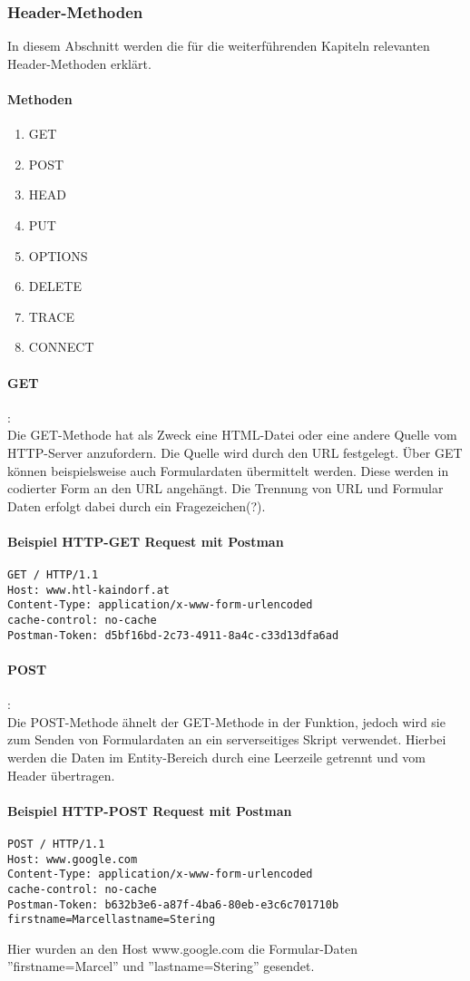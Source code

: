 \subsubsection{Header-Methoden}
In diesem Abschnitt werden die für die weiterführenden Kapiteln relevanten Header-Methoden erklärt.
\paragraph{Methoden}
\begin{enumerate}
\item GET
\item POST
\item HEAD
\item PUT
\item OPTIONS
\item DELETE
\item TRACE
\item CONNECT
\end{enumerate}
\paragraph{GET}:\\Die GET-Methode hat als Zweck eine HTML-Datei oder eine andere Quelle vom HTTP-Server anzufordern. Die Quelle wird durch den URL festgelegt. Über GET können beispielsweise auch Formulardaten übermittelt werden. Diese werden in codierter Form an den URL angehängt. Die Trennung von URL und Formular Daten erfolgt dabei durch ein Fragezeichen(?).
\paragraph{Beispiel HTTP-GET Request mit Postman}
\begin{lstlisting}[caption={HTTP GET}]
GET / HTTP/1.1
Host: www.htl-kaindorf.at
Content-Type: application/x-www-form-urlencoded
cache-control: no-cache
Postman-Token: d5bf16bd-2c73-4911-8a4c-c33d13dfa6ad
\end{lstlisting}
\paragraph{POST}:\\Die POST-Methode ähnelt der GET-Methode in der Funktion, jedoch wird sie zum Senden von Formulardaten an ein serverseitiges Skript verwendet. Hierbei werden die Daten im Entity-Bereich durch eine Leerzeile getrennt und vom Header übertragen.
\paragraph{Beispiel HTTP-POST Request mit Postman}
\begin{lstlisting}[caption={HTTP POST}]
POST / HTTP/1.1
Host: www.google.com
Content-Type: application/x-www-form-urlencoded
cache-control: no-cache
Postman-Token: b632b3e6-a87f-4ba6-80eb-e3c6c701710b
firstname=Marcellastname=Stering
\end{lstlisting}
Hier wurden an den Host www.google.com die Formular-Daten ''firstname=Marcel'' und ''lastname=Stering'' gesendet.
